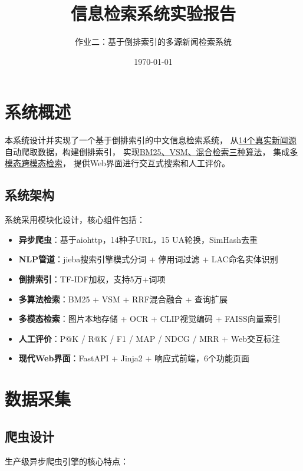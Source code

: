 \documentclass[12pt,a4paper]{ctexart}
\title{信息检索系统实验报告}
\author{作业二：基于倒排索引的多源新闻检索系统}
\date{\today}
\begin{document}
\maketitle

\section{系统概述}

本系统设计并实现了一个基于倒排索引的中文信息检索系统，
从\underline{14个真实新闻源}自动爬取数据，构建倒排索引，
实现\underline{BM25、VSM、混合检索三种算法}，
集成\underline{多模态跨模态检索}，
提供Web界面进行交互式搜索和人工评价。

\subsection{系统架构}

系统采用模块化设计，核心组件包括：
\begin{itemize}
    \item \textbf{异步爬虫}：基于aiohttp，14种子URL，15 UA轮换，SimHash去重
    \item \textbf{NLP管道}：jieba搜索引擎模式分词 + 停用词过滤 + LAC命名实体识别
    \item \textbf{倒排索引}：TF-IDF加权，支持5万+词项
    \item \textbf{多算法检索}：BM25 + VSM + RRF混合融合 + 查询扩展
    \item \textbf{多模态检索}：图片本地存储 + OCR + CLIP视觉编码 + FAISS向量索引
    \item \textbf{人工评价}：P@K / R@K / F1 / MAP / NDCG / MRR + Web交互标注
    \item \textbf{现代Web界面}：FastAPI + Jinja2 + 响应式前端，6个功能页面
\end{itemize}

\section{数据采集}

\subsection{爬虫设计}

生产级异步爬虫引擎的核心特点：
\end{document}
